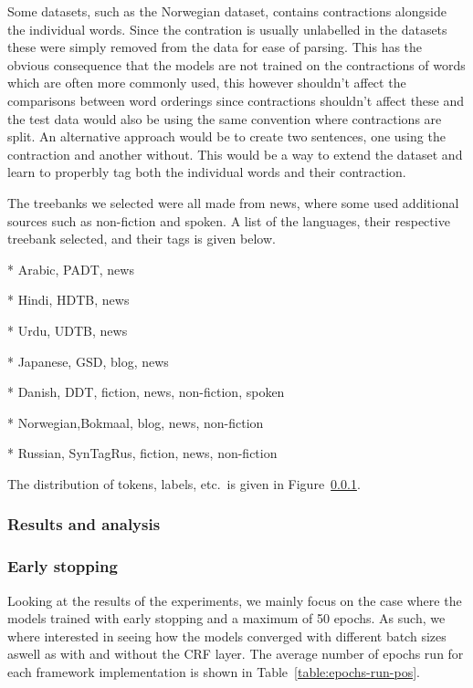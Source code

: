 Some datasets, such as the Norwegian dataset, contains contractions alongside
the individual words. Since the contration is usually unlabelled in the datasets
these were simply removed from the data for ease of parsing. This has the
obvious consequence that the models are not trained on the contractions of words
which are often more commonly used, this however shouldn't affect the
comparisons between word orderings since contractions shouldn't affect these and
the test data would also be using the same convention where contractions are
split. An alternative approach would be to create two sentences, one using the
contraction and another without. This would be a way to extend the dataset and
learn to properbly tag both the individual words and their contraction.

The treebanks we selected were all made from news, where some used additional
sources such as non-fiction and spoken. A list of the languages, their
respective treebank selected, and their tags is given below.

* Arabic,   PADT, news

* Hindi,    HDTB, news

* Urdu,     UDTB, news

* Japanese, GSD, blog, news

* Danish,   DDT, fiction, news, non-fiction, spoken

* Norwegian,Bokmaal, blog, news, non-fiction

* Russian,  SynTagRus, fiction, news, non-fiction

The distribution of tokens, labels, etc.\ is given in Figure~\ref{}.

\subsubsection{Results and analysis}

\subsubsection*{Early stopping}

Looking at the results of the experiments, we mainly focus on the case where the
models trained with early stopping and a maximum of 50 epochs. As such, we where
interested in seeing how the models converged with different batch sizes aswell
as with and without the CRF layer. The average number of epochs run for each
framework implementation is shown in Table~\ref{table:epochs-run-pos}.

